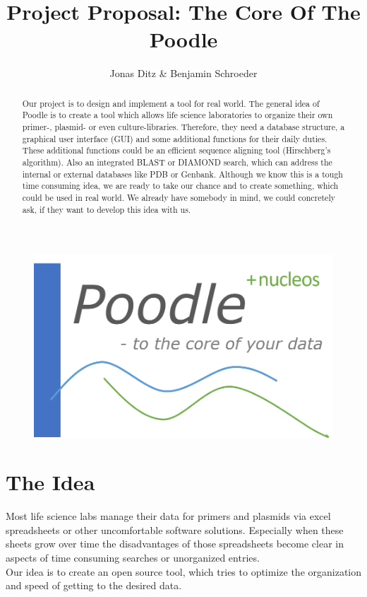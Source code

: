 \documentclass[]{article}
\title{Project Proposal: The Core Of The Poodle}
\author{Jonas Ditz  \& Benjamin Schroeder}
\begin{document}
\maketitle
\begin{figure}[h]
	\centering
	\includegraphics[scale=0.35]{img/logo_poodle.png}
\end{figure}

\begin{abstract}
Our project is to design and implement a tool for real world. The general idea of Poodle is to create a tool which allows life science laboratories to organize their own primer-, plasmid- or even culture-libraries. Therefore, they need a database structure, a graphical user interface (GUI) and some additional functions for their daily duties. These additional functions could be an efficient sequence aligning tool (Hirschberg's algorithm). Also an integrated BLAST or DIAMOND search, which can address the internal or external databases like PDB or Genbank. Although we know this is a tough time consuming idea, we are ready to take our chance and to create something, which could be used in real world. We already have somebody in mind, we could concretely ask, if they want to develop this idea with us.
\end{abstract}

\section{ The Idea}
Most life science labs manage their data for primers and plasmids via excel spreadsheets or other uncomfortable software solutions. Especially when these sheets grow over time the disadvantages of those spreadsheets become clear in aspects of time consuming searches or unorganized entries. 
\\
Our idea is to create an open source tool, which tries to optimize the organization and speed of getting to the desired data.
\end{document}
